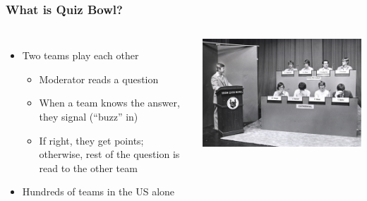 \documentclass[aspectratio=169,xcolor=dvipsnames]{beamer}
\begin{document}
\begin{frame}
	\frametitle{What is Quiz Bowl?}
	\begin{columns}

	\begin{itemize}
		\item Two teams play each other
		\begin{itemize}
			\item Moderator reads a question
			\item When a team knows the answer, they signal (``buzz'' in)
			\item If right, they get points; otherwise, rest of the question is read to the other team
		\end{itemize}
		\item Hundreds of teams in the US alone
	\end{itemize}

	\includegraphics{qb/quizbowl}

	\end{columns}

\end{frame}
\end{document}
